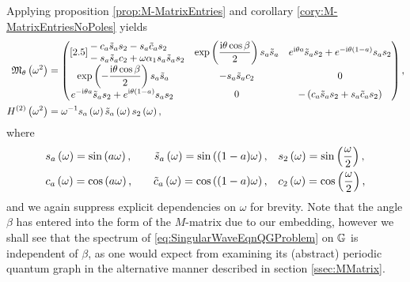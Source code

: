 Applying proposition \ref{prop:M-MatrixEntries} and corollary \ref{cory:M-MatrixEntriesNoPoles} yields
\begin{align*} 
	\mathfrak{M}_\theta\left( \omega^2 \right) &=
	\begin{pmatrix}[2.5]
		\begin{split}
			&-c_a \tilde{s}_a s_2 
			- s_a \tilde{c}_a s_2  \\
			&- s_a \tilde{s}_a c_2
			+ \omega\alpha_1 s_a \tilde{s}_a s_2
		\end{split} &
		\exp\left( \dfrac{\mathrm{i}\theta\cos\beta}{2} \right)s_a \tilde{s}_a &
		e^{\mathrm{i}\theta a}\tilde{s}_a s_2 + e^{-\mathrm{i}\theta(1-a)}s_a s_2 \\
		\begin{split}		
			& \exp\left( -\dfrac{\mathrm{i}\theta\cos\beta}{2} \right)s_a \tilde{s}_a 
		\end{split} &
		-s_a \tilde{s}_a c_2 &
		0 \\
		\begin{split}
			& e^{-\mathrm{i}\theta a}\tilde{s}_a s_2 + e^{\mathrm{i}\theta(1-a)}s_a s_2 
		\end{split} &
		0 &
		-\left( c_a \tilde{s}_a s_2 + s_a \tilde{c}_a s_2 \right)
	\end{pmatrix}, \\
	H^{(2)}\left( \omega^2 \right) &= \omega^{-1} s_a\left( \omega \right) \tilde{s}_a\left( \omega \right) s_2\left( \omega \right),
\end{align*}
where
\begin{alignat*}{3}
	& s_a\left( \omega \right) = \sin\left( a\omega \right), \quad
	& \tilde{s}_a\left( \omega \right) = \sin\left( (1-a)\omega \right), \quad
	& s_2\left( \omega \right) = \sin\left( \frac{\omega}{2} \right), \\
	& c_a\left( \omega \right) = \cos\left( a\omega \right), \quad
	& \tilde{c}_a\left( \omega \right) = \cos\left( (1-a)\omega \right), \quad
	& c_2\left( \omega \right) = \cos\left( \frac{\omega}{2} \right),
\end{alignat*}
and we again suppress explicit dependencies on $\omega$ for brevity.
Note that the angle $\beta$ has entered into the form of the $M$-matrix due to our embedding, however we shall see that the spectrum of \eqref{eq:SingularWaveEqnQGProblem} on $\mathbb{G}$ is independent of $\beta$, as one would expect from examining its (abstract) periodic quantum graph in the alternative manner described in section \ref{ssec:MMatrix}.

